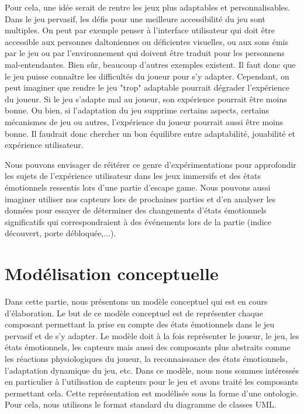 \documentclass[11pt]{article}
\begin{document}
		Pour cela, une idée serait de rentre les jeux plus adaptables et personnalisables.
		Dans le jeu pervasif, les défis pour une meilleure accessibilité du jeu sont multiples.
		On peut par exemple penser à l'interface utilisateur qui doit être accessible aux personnes daltoniennes ou déficientes visuelles, ou aux sons émis par le jeu ou par l'environnement qui doivent être traduit pour les personnens mal-entendantes.
		Bien sûr, beaucoup d'autres exemples existent.
		Il faut donc que le jeu puisse connaître les difficultés du joueur pour s'y adapter.
		Cependant, on peut imaginer que rendre le jeu "trop" adaptable pourrait dégrader l'expérience du joueur.
		Si le jeu s'adapte mal au joueur, son expérience pourrait être moins bonne.
		Ou bien, si l'adaptation du jeu supprime certains aspects, certains mécanismes de jeu ou autres, l'expérience du joueur pourrait aussi être moins bonne. 
		Il faudrait donc chercher un bon équilibre entre adaptabilité, jouabilité et expérience utilisateur.\par
		Nous pouvons envisager de réitérer ce genre d'expérimentations pour approfondir les sujets de l'expérience utilisateur dans les jeux immersifs et des états émotionnels ressentis lors d'une partie d'escape game.
		Nous pouvons aussi imaginer utiliser nos capteurs lors de prochaines parties et d'en analyser les données pour essayer de déterminer des changements d'états émotionnels significatifs qui correspondraient à des événements lors de la partie (indice découvert, porte débloquée,...).

\section{Modélisation conceptuelle}\label{sec:modelisation}
	Dans cette partie, nous présentons un modèle conceptuel qui est en cours d'élaboration.
	Le but de ce modèle conceptuel est de représenter chaque composant permettant la prise en compte des états émotionnels dans le jeu pervasif et de s'y adapter.
	Le modèle doit à la fois représenter le joueur, le jeu, les états émotionnels, les capteurs mais aussi des composants plus abstraits comme les réactions physiologiques du joueur, la reconnaissance des états émotionnels, l'adaptation dynamique du jeu, etc.
	Dans ce modèle, nous nous sommes intéressés en particulier à l'utilisation de capteurs pour le jeu et avons traité les composants permettant cela.
	Cette représentation est modélisée sous la forme d'une ontologie.
	Pour cela, nous utilisons le format standard du diagramme de classes UML.
\end{document}
